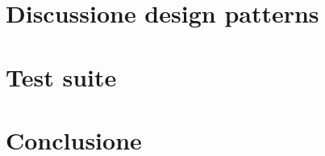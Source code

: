 \documentclass[12pt, a4paper]{article}
\numberwithin{equation}{section} %
\begin{document}





\section{Discussione design patterns}


\section{Test suite}


\section{Conclusione}

\end{document}
